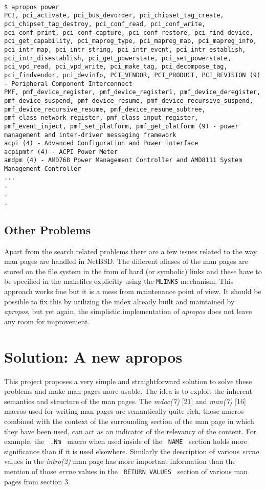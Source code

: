\documentclass[letterpaper,twocolumn,10pt]{article}
\begin{document}
{\tt \small
{}
\begin{lstlisting}[float=*]
$ apropos power
PCI, pci_activate, pci_bus_devorder, pci_chipset_tag_create,
pci_chipset_tag_destroy, pci_conf_read, pci_conf_write,
pci_conf_print, pci_conf_capture, pci_conf_restore, pci_find_device,
pci_get_capability, pci_mapreg_type, pci_mapreg_map, pci_mapreg_info,
pci_intr_map, pci_intr_string, pci_intr_evcnt, pci_intr_establish,
pci_intr_disestablish, pci_get_powerstate, pci_set_powerstate,
pci_vpd_read, pci_vpd_write, pci_make_tag, pci_decompose_tag,
pci_findvendor, pci_devinfo, PCI_VENDOR, PCI_PRODUCT, PCI_REVISION (9)
- Peripheral Component Interconnect
PMF, pmf_device_register, pmf_device_register1, pmf_device_deregister,
pmf_device_suspend, pmf_device_resume, pmf_device_recursive_suspend,
pmf_device_recursive_resume, pmf_device_resume_subtree,
pmf_class_network_register, pmf_class_input_register,
pmf_event_inject, pmf_set_platform, pmf_get_platform (9) - power
management and inter-driver messaging framework
acpi (4) - Advanced Configuration and Power Interface
acpipmtr (4) - ACPI Power Meter
amdpm (4) - AMD768 Power Management Controller and AMD8111 System
Management Controller
...
.
.
.
\end{lstlisting}
}

\subsection{Other Problems}
Apart from the search related problems there are a few issues related to
the way man pages are handled in NetBSD. The different aliases of the man pages
are stored on the file system in the from of hard (or symbolic) links and these
have to be specified in the makefiles explicitly using the {\tt MLINKS}
mechanism. This
approach works fine but it is a mess from maintenance point of view.
It should be possible to fix this by utilizing the index already built and
maintained by \textit{apropos}, but yet again, the simplistic implementation of
\textit{apropos} does not leave any room for improvement.

\section{Solution: A new apropos}
This project proposes a very simple and straightforward solution to solve these
problems and make man pages more usable. The idea is to exploit the inherent
semantics and structure of the man pages. The \textit{mdoc(7)} [21] and
\textit{man(7)} [16] macros used for writing man pages are semantically quite
rich, those macros combined with the context of the surrounding section of the
man page in which they have been used, can act
as an indicator of the relevancy of the content. For example, the
{\tt \small
.Nm
}
macro when used inside of the
{\tt \small
NAME
}
section holds more significance than if it is used elsewhere. Similarly the description of various \textit{errno} values in the
\textit{intro(2)} man page has more important information than the mention of
those \textit{errno} values in the
{\tt \small
RETURN VALUES
}
section of various man pages from section 3. \\
\end{document}

